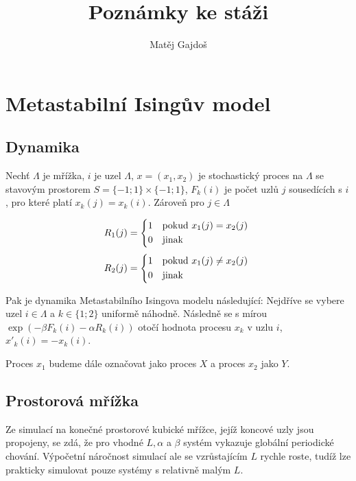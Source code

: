 \documentclass{article}
\begin{document}
\title{Poznámky ke stáži}
\author{Matěj Gajdoš}

\maketitle
\newpage
\tableofcontents
\newpage

\section{Metastabilní Isingův model}
\subsection{Dynamika}
Nechť $\Lambda$ je mřížka, $i$ je uzel $\Lambda$, $x = (x_1, x_2)$ je stochastický proces na $\Lambda$ se stavovým prostorem $S = \{-1; 1\} \times \{-1; 1\}$, $F_k(i)$ je počet uzlů $j$ sousedících s $i$, pro které platí $x_k(j) = x_k(i)$. Zároveň pro $j \in \Lambda$

\begin{equation}
    R_1(j) = 
    \begin{cases*}
      1 & pokud $x_1(j) = x_2(j)$ \\
      0        & jinak
    \end{cases*}
\end{equation}
\begin{equation}
    R_2(j) = 
    \begin{cases*}
      1 & pokud $x_1(j) \neq x_2(j)$ \\
      0        & jinak
    \end{cases*}
\end{equation}

Pak je dynamika Metastabilního Isingova modelu následující: Nejdříve se vybere uzel $i \in \Lambda$ a $k \in \{1; 2\}$ uniformě náhodně. Následně se s mírou $\exp(-\beta F_k(i) - \alpha R_k(i))$ otočí hodnota procesu $x_k$ v uzlu $i$, $x'_k(i) = -x_k(i)$.

Proces $x_1$ budeme dále označovat jako proces $X$ a proces $x_2$ jako $Y$. 

\subsection{Prostorová mřížka}
Ze simulací na konečné prostorové kubické mřížce, jejíž koncové uzly jsou propojeny, se zdá, že pro vhodné $L, \alpha$ a $\beta$ systém vykazuje globální periodické chování. Výpočetní náročnost simulací ale se vzrůstajícím $L$ rychle roste, tudíž lze prakticky simulovat pouze systémy s relativně malým $L$.
\end{document}

